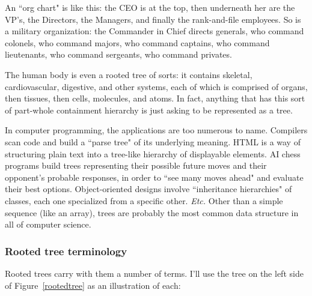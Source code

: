 An ``org chart" is like this: the CEO is at the top, then underneath her
are the VP's, the Directors, the Managers, and finally the rank-and-file
employees. So is a military organization: the Commander in Chief directs
generals, who command colonels, who command majors, who command captains,
who command lieutenants, who command sergeants, who command privates.

The human body is even a rooted tree of sorts: it contains skeletal,
cardiovascular, digestive, and other systems, each of which is comprised of
organs, then tissues, then cells, molecules, and atoms. In fact, anything
that has this sort of part-whole containment hierarchy is just asking to be
represented as a tree.

In computer programming, the applications are too numerous to name.
Compilers scan code and build a ``parse tree" of its underlying meaning.
HTML is a way of structuring plain text into a tree-like hierarchy of
displayable elements. AI chess programs build trees representing their
possible future moves and their opponent's probable responses, in order to
``see many moves ahead" and evaluate their best options. Object-oriented
designs involve ``inheritance hierarchies" of classes, each one specialized
from a specific other. \textit{Etc.} Other than a simple sequence (like an
array), trees are probably the most common data structure in all of
computer science.

\subsubsection{Rooted tree terminology}

Rooted trees carry with them a number of terms. I'll use the tree on the
left side of Figure~\ref{rootedtree} as an illustration of each:

